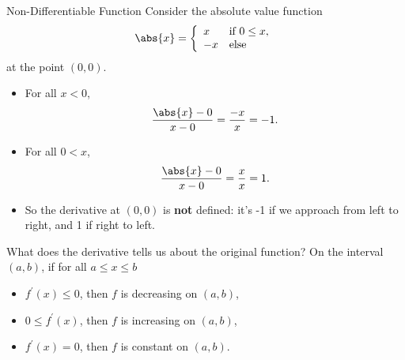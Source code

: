 \documentclass[Lecture.tex]{subfiles}
\begin{document}
\begin{frame}{Non-Differentiable Function}
  Consider the absolute value function
  $$\abs{x} = \left\{\begin{array}{ll}x & \text{if}\ 0 \leq x,\\-x & \text{else}\end{array} \right.$$
  at the point $(0,0)$.
  \begin{itemize}
  \item<2->
    For all $x < 0$, 
    $$\frac{\abs{x} - 0}{x - 0} = \frac{-x}{x} = -1.$$
  \item<3->
    For all $0 < x$,
    $$\frac{\abs{x} - 0}{x - 0} = \frac{x}{x} = 1.$$
  \item<4->
    So the derivative at $(0,0)$ is {\bf not} defined: it's -1 if we approach from left to right, and 1 if right to left.
  \end{itemize}
\end{frame}

\begin{frame}
  What does the derivative tells us about the original function?
  On the interval $(a,b)$, if for all $a \leq x \leq b$
  \begin{itemize}
  \item<2->
    $f^\prime(x) \leq 0$, then $f$ is decreasing on $(a,b)$,
  \item<3->
    $0 \leq f^\prime(x)$, then $f$ is increasing on $(a,b)$,
  \item<4->
    $f^\prime(x) = 0$, then $f$ is constant on $(a,b)$.
  \end{itemize}
\end{frame}
\end{document}
